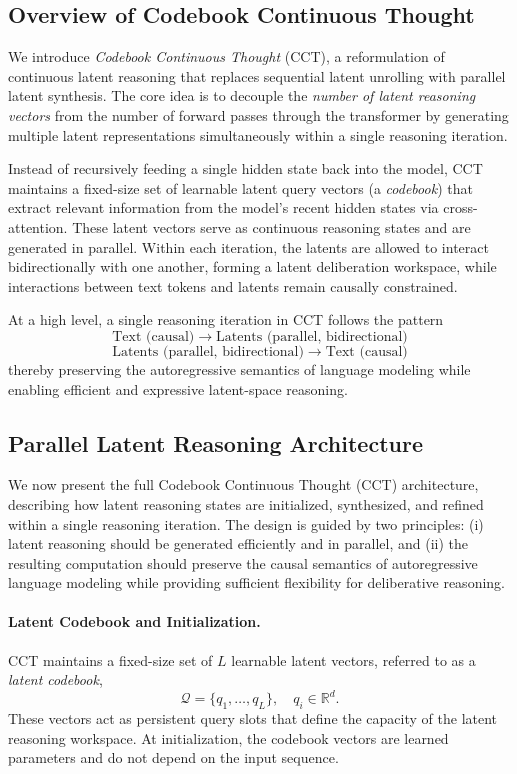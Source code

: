 \subsection{Overview of Codebook Continuous Thought}
\label{sec:overview_cct}

We introduce \emph{Codebook Continuous Thought} (CCT), a reformulation of continuous latent reasoning that replaces sequential latent unrolling with parallel latent synthesis. The core idea is to decouple the \emph{number of latent reasoning vectors} from the number of forward passes through the transformer by generating multiple latent representations simultaneously within a single reasoning iteration.

Instead of recursively feeding a single hidden state back into the model, CCT maintains a fixed-size set of learnable latent query vectors (a \emph{codebook}) that extract relevant information from the model’s recent hidden states via cross-attention. These latent vectors serve as continuous reasoning states and are generated in parallel. Within each iteration, the latents are allowed to interact bidirectionally with one another, forming a latent deliberation workspace, while interactions between text tokens and latents remain causally constrained.

At a high level, a single reasoning iteration in CCT follows the pattern
\[
\text{Text (causal)} \;\rightarrow\; \text{Latents (parallel, bidirectional)}
\]
\[
\text{Latents (parallel, bidirectional)} \;\rightarrow\; \text{Text (causal)}
\]
thereby preserving the autoregressive semantics of language modeling while enabling efficient and expressive latent-space reasoning.


\subsection{Parallel Latent Reasoning Architecture}
\label{sec:parallel_latent_reasoning}

We now present the full Codebook Continuous Thought (CCT) architecture, describing how latent reasoning states are initialized, synthesized, and refined within a single reasoning iteration. The design is guided by two principles: (i) latent reasoning should be generated efficiently and in parallel, and (ii) the resulting computation should preserve the causal semantics of autoregressive language modeling while providing sufficient flexibility for deliberative reasoning.

\paragraph{Latent Codebook and Initialization.}
CCT maintains a fixed-size set of $L$ learnable latent vectors, referred to as a \emph{latent codebook},
\[
\mathcal{Q} = \{ q_1, \dots, q_L \}, \quad q_i \in \mathbb{R}^d.
\]
These vectors act as persistent query slots that define the capacity of the latent reasoning workspace. At initialization, the codebook vectors are learned parameters and do not depend on the input sequence.

